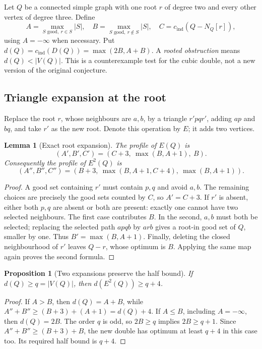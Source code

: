 \documentclass[11pt]{article}
\newtheorem{lemma}[theorem]{Lemma}
\newtheorem{proposition}[theorem]{Proposition}
\newcommand{\cind}{c_{\mathrm{ind}}}
\begin{document}
Let $Q$ be a connected simple graph with one root $r$ of degree two
and every other vertex of degree three. Define
\[
 A=\max_{S\text{ good},\ r\in S}|S|,\quad
 B=\max_{S\text{ good},\ r\notin S}|S|,\quad
 C=\cind(Q-N_Q[r]),
\]
using $A=-\infty$ when necessary. Put $d(Q)=\cind(D(Q))=
\max(2B,A+B)$. A \emph{rooted obstruction} means $d(Q)<|V(Q)|$.
This is a counterexample test for the cubic double, not a new
version of the original conjecture.

\subsection{Triangle expansion at the root}
Replace the root $r$, whose neighbours are $a,b$, by a triangle
$r'p q r'$, adding $ap$ and $bq$, and take $r'$ as the new root.
Denote this operation by $E$; it adds two vertices.

\begin{lemma}[Exact root expansion]\label{lem:root-expansion-map}
The profile of $E(Q)$ is
\[
 (A',B',C')=(C+3,\ \max(B,A+1),\ B).
\]
Consequently the profile of $E^2(Q)$ is
\[
 (A'',B'',C'')=
 (B+3,\ \max(B,A+1,C+4),\ \max(B,A+1)).
\]
\end{lemma}
\begin{proof}
A good set containing $r'$ must contain $p,q$ and avoid $a,b$.
The remaining choices are precisely the good sets counted by $C$,
so $A'=C+3$.
If $r'$ is absent, either both $p,q$ are absent or both are present:
exactly one cannot have two selected neighbours. The first case
contributes $B$. In the second, $a,b$ must both be selected;
replacing the selected path $apqb$ by $arb$ gives a root-in good
set of $Q$, smaller by one. Thus $B'=\max(B,A+1)$.
Finally, deleting the closed neighbourhood of $r'$ leaves $Q-r$,
whose optimum is $B$. Applying the same map again proves the
second formula.
\end{proof}

\begin{proposition}[Two expansions preserve the half bound]
\label{prop:root-two-expansions}
If $d(Q)\geq q=|V(Q)|$, then $d(E^2(Q))\geq q+4$.
\end{proposition}
\begin{proof}
If $A>B$, then $d(Q)=A+B$, while
$A''+B''\geq(B+3)+(A+1)=d(Q)+4$.
If $A\leq B$, including $A=-\infty$, then $d(Q)=2B$.
The order $q$ is odd, so $2B\geq q$ implies $2B\geq q+1$.
Since $A''+B''\geq(B+3)+B$, the new double has optimum at least
$q+4$ in this case too. Its required half bound is $q+4$.
\end{proof}
\end{document}
